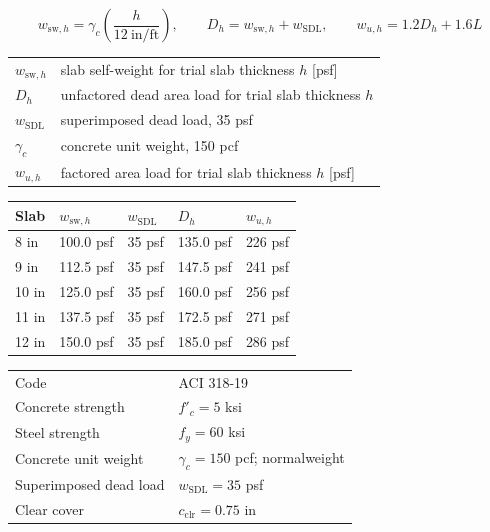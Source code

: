 \documentclass[10pt]{article}
\begin{document}

\begin{equation}
w_{\mathrm{sw},h}=\gamma_c
\left(\frac{h}{12\ \text{in/ft}}\right),
\qquad
D_h=w_{\mathrm{sw},h}+w_{\mathrm{SDL}},
\qquad
w_{u,h}=1.2D_h+1.6L
\end{equation}

{\ttfamily\footnotesize
\begin{tabular}{@{}ll@{}}
$w_{\mathrm{sw},h}$ & slab self-weight for trial slab thickness $h$ [psf] \\
$D_h$ & unfactored dead area load for trial slab thickness $h$ \\
$w_{\mathrm{SDL}}$ & superimposed dead load, 35 psf \\
$\gamma_c$ & concrete unit weight, 150 pcf \\
$w_{u,h}$ & factored area load for trial slab thickness $h$ [psf] \\
\end{tabular}
}


{\ttfamily\footnotesize
\renewcommand{\arraystretch}{1.15}
\begin{tabular}{@{}p{0.70in}p{1.10in}p{0.95in}p{1.10in}p{1.10in}@{}}
Slab & $w_{\mathrm{sw},h}$ & $w_{\mathrm{SDL}}$ & $D_h$ & $w_{u,h}$ \\
\hline
8 in  & 100.0 psf & 35 psf & 135.0 psf & 226 psf \\
9 in  & 112.5 psf & 35 psf & 147.5 psf & 241 psf \\
10 in & 125.0 psf & 35 psf & 160.0 psf & 256 psf \\
11 in & 137.5 psf & 35 psf & 172.5 psf & 271 psf \\
12 in & 150.0 psf & 35 psf & 185.0 psf & 286 psf \\
\end{tabular}
}


{\ttfamily\footnotesize
\begin{tabular}{@{}p{1.65in}p{5.05in}@{}}
Code & ACI 318-19 \\
Concrete strength & $f'_c=5$ ksi \\
Steel strength & $f_y=60$ ksi \\
Concrete unit weight & $\gamma_c=150$ pcf; normalweight \\
Superimposed dead load & $w_{\mathrm{SDL}}=35$ psf \\
Clear cover & $c_{\text{clr}}=0.75$ in \\
\end{tabular}
}
\end{document}

